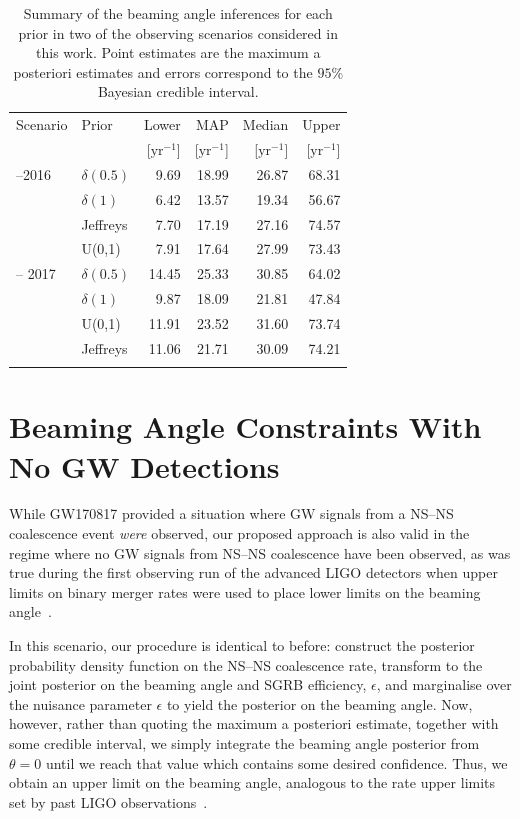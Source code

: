 \documentclass[twocolumn]{aastex61}
\newcommand{\yr}{\mathrm{yr}}
\newcommand{\BNS}{\ac{NS}--\ac{NS}\xspace}
\begin{document}
\begin{table}
\centering
\begin{tabular}{llrrrr}
  \toprule
  Scenario & Prior & Lower & MAP & Median & Upper \\
  && [$\yr^{-1}$] & [$\yr^{-1}$]    & [$\yr^{-1}$]    & [$\yr^{-1}$]  \\
  \colrule
  2015--2016 & $\delta(0.5)$ 	 & 9.69	 & 18.99	& 26.87	& 68.31	 \\
           & $\delta(1)$ 	 & 6.42	 & 13.57	& 19.34	& 56.67	 \\
           & Jeffreys 	 & 7.70	 & 17.19	& 27.16	& 74.57	 \\
           & U(0,1) 	 & 7.91	 & 17.64	& 27.99	& 73.43	 \\
  \colrule
  2016 -- 2017 & $\delta(0.5)$ 	 & 14.45	 & 25.33	& 30.85	& 64.02	 \\
           & $\delta(1)$ 	 & 9.87	 & 18.09	& 21.81	& 47.84	 \\
           & U(0,1) 	 & 11.91	 & 23.52	& 31.60	& 73.74	 \\
           & Jeffreys 	 & 11.06	 & 21.71	& 30.09	& 74.21	 \\
\botrule
\end{tabular}
\caption{Summary of the beaming angle inferences for each prior in two of the observing scenarios considered in this work.
    Point estimates are the maximum a posteriori estimates and errors correspond to the $95\%$ Bayesian credible interval.
    \label{tab:aligo_beam_inference}}
\end{table}

\section{Beaming Angle Constraints With No \ac{GW} Detections}
\label{sec:beaming_limits}
While GW170817 provided a situation where \ac{GW} signals from a \BNS
coalescence event \emph{were} observed, our proposed approach is also
valid in the regime where no \ac{GW} signals from \BNS coalescence
have been observed, as was true during the first observing run of the
advanced LIGO detectors when upper limits on binary merger rates were
used to place lower limits on the beaming angle~\cite{Abbott:2016ymx}.

In this scenario, our procedure is identical to before:
construct the posterior probability density function on the \BNS
coalescence rate, transform to the joint posterior on the beaming
angle and \ac{SGRB} efficiency, $\epsilon$, and marginalise over the
nuisance parameter $\epsilon$ to yield the posterior on the beaming
angle.  Now, however, rather than quoting the maximum a posteriori
estimate, together with some credible interval, we simply integrate
the beaming angle posterior from $\theta=0$ until we reach that value
which contains some desired confidence.  Thus, we obtain an upper
limit on the beaming angle, analogous to the rate upper limits set by
past LIGO observations~\cite{Colaboration:2011np}.
\end{document}
